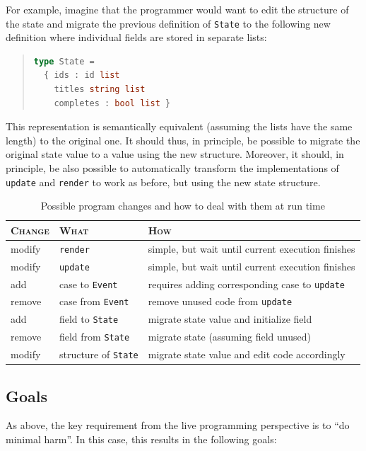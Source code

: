 \documentclass[english,submission]{programming}
\begin{document}
For example, imagine that the programmer would want to edit the structure of the state and migrate the previous definition of \texttt{State} to the following new definition where individual fields are stored in separate lists:

\begin{quote}
\begin{lstlisting}[language=ml,morekeywords={on}]
type State =
  { ids : id list
    titles string list
    completes : bool list }
\end{lstlisting}
\end{quote}

This representation is semantically equivalent (assuming the lists have the same length) to the original one. It should thus, in principle, be possible to migrate the original state value to a value using the new structure. Moreover, it should, in principle, be also possible to automatically transform the implementations of \texttt{update} and \texttt{render} to work as before, but using the new state structure.

\begin{table}[t]
  \centering
\begin{tabular}{lll}\toprule
\textsc{Change} & \textsc{What} & \textsc{How}\\\midrule
modify & \texttt{render} & simple, but wait until current execution finishes  \\
modify & \texttt{update} & simple, but wait until current execution finishes  \\
add & case to \texttt{Event} & requires adding corresponding case to \texttt{update} \\
remove & case from \texttt{Event} & remove unused code from \texttt{update} \\
add & field to \texttt{State} & migrate state value and initialize field \\
remove & field from \texttt{State} & migrate state (assuming field unused) \\
modify & structure of \texttt{State} & migrate state value and edit code accordingly \\
\bottomrule
\end{tabular}
\caption{Possible program changes and how to deal with them at run time}
\label{TBL:elmchanges}
\end{table}


\subsection{Goals}
As above, the key requirement from the live programming perspective is to “do minimal harm”. In this case, this results in the following goals:
\end{document}
